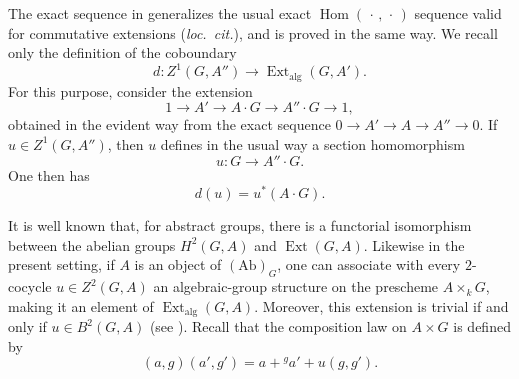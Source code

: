 
The exact sequence in  generalizes the usual exact
\(\operatorname{Hom}(\,\cdot\,,\,\cdot\,)\) sequence valid for
commutative extensions (\emph{loc.\ cit.}), and is proved in the
same way.  We recall only the definition of the coboundary
\[
  d:Z^1(G,A'')\longrightarrow
    \operatorname{Ext}_{\mathrm{alg}}(G,A').
\]
For this purpose, consider the extension
\[
  1\longrightarrow A'\longrightarrow A\mathbin{\cdot}G
    \longrightarrow A''\mathbin{\cdot}G\longrightarrow1,
\]
obtained in the evident way from the exact sequence
\(0\to A'\to A\to A''\to0\).  If \(u\in Z^1(G,A'')\), then
\(u\) defines in the usual way a section homomorphism
\[
  u:G\longrightarrow A''\mathbin{\cdot}G.
\]
One then has
\[
  d(u)=u^*(A\mathbin{\cdot}G).
\]


It is well known that, for abstract groups, there is a functorial
isomorphism between the abelian groups \(H^2(G,A)\) and
\(\operatorname{Ext}(G,A)\).  Likewise in the present setting,
if \(A\) is an object of \((\mathrm{Ab})_G\), one can associate
with every \(2\)-cocycle \(u\in Z^2(G,A)\) an algebraic-group
structure on the prescheme \(A\times_kG\), making it an element
of \(\operatorname{Ext}_{\mathrm{alg}}(G,A)\).  Moreover, this
extension is trivial if and only if \(u\in B^2(G,A)\) (see
).  Recall that the composition law on
\(A\times G\) is defined by
\[
  (a,g)(a',g')=a+{}^g a'+u(g,g').
\]

